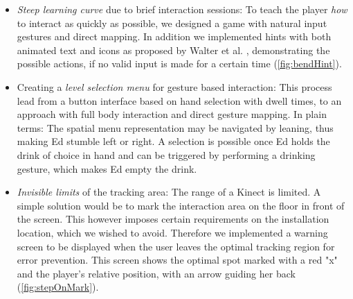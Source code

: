 \documentclass{chi-ext}
\begin{document}
\begin{itemize}
	\item \textit{Steep learning curve} due to brief interaction sessions: To teach the player \textit{how} to interact as quickly as possible, we designed a game with natural input gestures and direct mapping. In addition we implemented hints with both animated text and icons as proposed by Walter et al. \cite{walter2013strikeapose}, demonstrating the possible actions, if no valid input is made for a certain time (\autoref{fig:bendHint}).
\item Creating a \textit{level selection menu} for gesture based interaction: This process lead from a button interface based on hand selection with dwell times, to an approach with full body interaction and direct gesture mapping. In plain terms: The spatial menu representation may be navigated by leaning, thus making Ed stumble left or right. A selection is possible once Ed holds the drink of choice in hand and can be triggered by performing a drinking gesture, which makes Ed empty the drink.
\item \textit{Invisible limits} of the tracking area: The range of a Kinect is limited. A simple solution would be to mark the interaction area on the floor in front of the screen. This however imposes certain requirements on the installation location, which we wished to avoid. Therefore we implemented a warning screen to be displayed when the user leaves the optimal tracking region for error prevention. This screen shows the optimal spot marked with a red "x" and the player's relative position, with an arrow guiding her back (\autoref{fig:stepOnMark}).
\end{itemize}

\end{document}
